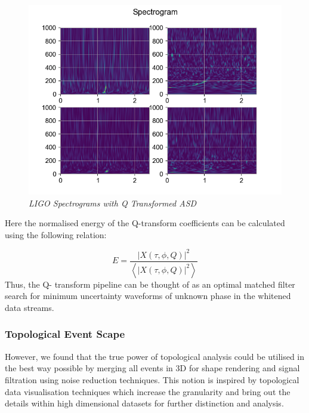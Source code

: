     \begin{figure}[H]
        \centering
        \includegraphics[width=1.0\linewidth]{images/46_03_LIGO Spectograms with Q Transformed ASD.png}
        \caption{\textit{LIGO Spectrograms with Q Transformed ASD}}
        \label{fig:LIGO Spectograms with Q Transformed ASD}
    \end{figure}

Here the normalised energy  of the Q-transform coefficients can be calculated using the following relation:

\begin{equation}
	E=\frac{|X(\tau, \phi, Q)|^{2}}{\left\langle|X(\tau, \phi, Q)|^{2}\right\rangle}
\end{equation}
Thus, the Q- transform pipeline can be thought of as an optimal matched filter search for minimum uncertainty waveforms of unknown phase in the whitened data streams.

    \subsubsection{Topological Event Scape}

    However, we found that the true power of topological analysis could be utilised in the best way possible by merging all events in 3D for shape rendering and signal filtration using noise reduction techniques. This notion is inspired by topological data visualisation techniques which increase the granularity and bring out the details within high dimensional datasets for further distinction and analysis.

